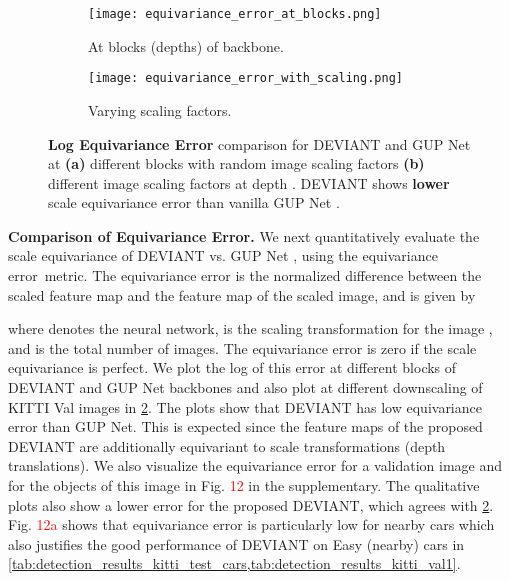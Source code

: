 \documentclass[runningheads]{llncs}
\newcommand{\equivariant} {equivariant}
\newcommand{\equivariance}{equivariance}
\newcommand{\Equivariance}{Equivariance}
\newcommand{\scaleEquivariance}{scale \equivariance}
\newcommand{\transformation}{transformation}
\newcommand{\kitti}{KITTI}
\newcommand{\valOne}{Val}
\newcommand{\gupNet}{GUP Net}
\newcommand{\noIndentHeading}[1]{\noindent\textbf{#1}}
\newcommand{\refSupFigure}[1]{Fig. \textcolor{red}{#1}}
\newcommand{\methodName}{DEVIANT}
\begin{document}
        \begin{figure}[!tb]
            \centering
            \begin{subfigure}{.36\linewidth}
              \centering
              \texttt{[image: equivariance\_error\_at\_blocks.png]}
              \caption{At blocks (depths) of backbone.}
            \end{subfigure}\begin{subfigure}{.36\linewidth}
              \centering
              \texttt{[image: equivariance\_error\_with\_scaling.png]}
              \caption{Varying scaling factors.}
              \label{fig:equiv_error_scaling}
            \end{subfigure}
            \caption{\textbf{Log \Equivariance{} Error } comparison for \methodName{} and \gupNet{} at \textbf{(a)} different blocks with random image scaling factors \textbf{(b)} different image scaling factors at depth . \methodName{} shows \textbf{lower} \scaleEquivariance{} error than vanilla \gupNet{} \cite{lu2021geometry}.}
            \label{fig:equiv_error}
        \end{figure}
        
                
\noIndentHeading{Comparison of \Equivariance{} Error.}
            We next quantitatively evaluate the \scaleEquivariance{} of \methodName{} vs. \gupNet{} \cite{lu2021geometry}, using the \equivariance{} error~metric\cite{sosnovik2020sesn}.
            The \equivariance{} error  is the normalized difference between the scaled feature map and the feature map of the scaled image, and is given by
                
where  denotes the neural network,  is the scaling transformation for the image , and  is the total number of images.
            The \equivariance{} error is zero if the \scaleEquivariance{} is perfect.
            We plot the log of this error at different blocks of \methodName{} and \gupNet{} backbones and also plot at different downscaling of \kitti{} \valOne{} images in \cref{fig:equiv_error}.
The plots show that \methodName{} has low \equivariance{} error than \gupNet.
            This is expected since the feature maps of the proposed \methodName{} are additionally \equivariant{} to scale \transformation s (depth translations).
            We also visualize the \equivariance{} error for a validation image and for the objects of this image in \refSupFigure{12} in the supplementary. The qualitative plots also show a lower error for the proposed \methodName, which agrees with \cref{fig:equiv_error}.
\refSupFigure{12a} shows that \equivariance{} error is particularly low for nearby cars which also justifies the good performance of \methodName{} on Easy (nearby) cars in \cref{tab:detection_results_kitti_test_cars,tab:detection_results_kitti_val1}.
    
\end{document}
